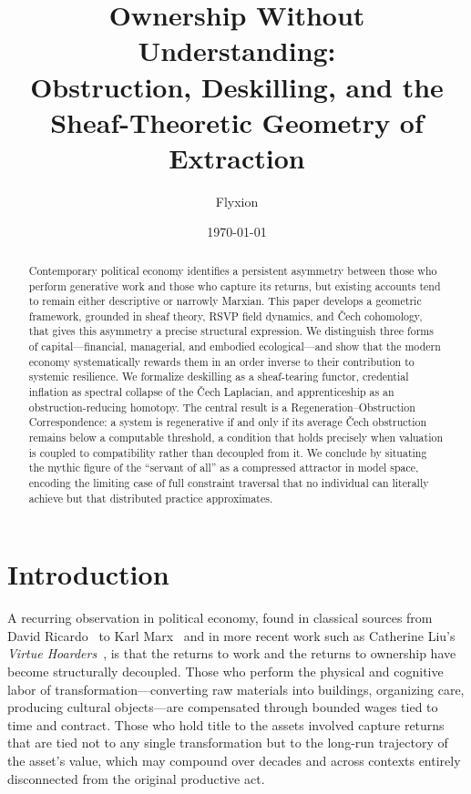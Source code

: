 \documentclass[12pt]{article}
\title{Ownership Without Understanding:\\
Obstruction, Deskilling, and the Sheaf-Theoretic Geometry of Extraction}
\author{Flyxion}
\date{\today}
\begin{document}
\maketitle

\begin{abstract}
Contemporary political economy identifies a persistent asymmetry between those who perform generative work and those who capture its returns, but existing accounts tend to remain either descriptive or narrowly Marxian. This paper develops a geometric framework, grounded in sheaf theory, RSVP field dynamics, and Čech cohomology, that gives this asymmetry a precise structural expression. We distinguish three forms of capital---financial, managerial, and embodied ecological---and show that the modern economy systematically rewards them in an order inverse to their contribution to systemic resilience. We formalize deskilling as a sheaf-tearing functor, credential inflation as spectral collapse of the Čech Laplacian, and apprenticeship as an obstruction-reducing homotopy. The central result is a Regeneration--Obstruction Correspondence: a system is regenerative if and only if its average Čech obstruction remains below a computable threshold, a condition that holds precisely when valuation is coupled to compatibility rather than decoupled from it. We conclude by situating the mythic figure of the ``servant of all'' as a compressed attractor in model space, encoding the limiting case of full constraint traversal that no individual can literally achieve but that distributed practice approximates.
\end{abstract}

\newpage
\section{Introduction}

A recurring observation in political economy, found in classical sources from David Ricardo~\cite{Ricardo1817} to Karl Marx~\cite{Marx1867} and in more recent work such as Catherine Liu's \emph{Virtue Hoarders}~\cite{Liu2021}, is that the returns to work and the returns to ownership have become structurally decoupled. Those who perform the physical and cognitive labor of transformation---converting raw materials into buildings, organizing care, producing cultural objects---are compensated through bounded wages tied to time and contract. Those who hold title to the assets involved capture returns that are tied not to any single transformation but to the long-run trajectory of the asset's value, which may compound over decades and across contexts entirely disconnected from the original productive act.
\end{document}
